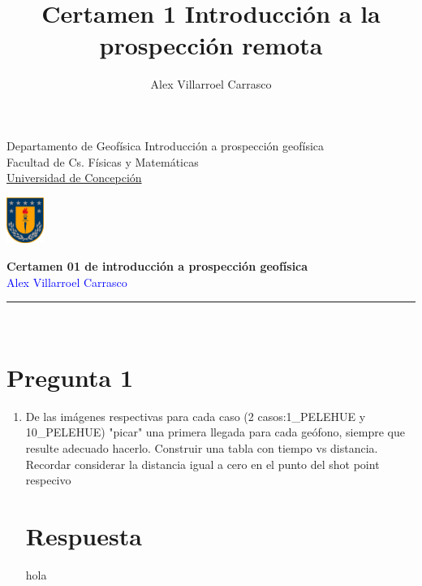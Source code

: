 \documentclass{article}
\title{Certamen 1 Introducción a la prospección remota}
\author{Alex Villarroel Carrasco}
\theoremstyle{mytheoremstyle}
\theoremstyle{mytheoremstyle}
\theoremstyle{myproblemstyle}
\begin{document}
\usetikzlibrary{positioning}
	\pagestyle{plain}
	\begin{flushleft}
		Departamento de Geofísica \hfill Introducción a prospección geofísica\\
		Facultad de Cs. Físicas y Matemáticas\\
		\underline{Universidad de Concepción}
	\end{flushleft}
	
	\begin{flushright}\vspace{-5mm}
		\includegraphics[height=1.5cm]{escudo}
	\end{flushright}
	
	\begin{center}\vspace{-1cm}
		\textbf{\large Certamen 01 de introducción a prospección geofísica}\\
		{\textcolor{blue}{Alex Villarroel Carrasco}}\\
	\end{center}
	\rule{\linewidth}{0.1mm}
	\\
    \section{Pregunta 1}
    \begin{enumerate}[label=\alph*)]
        \item De las imágenes respectivas para cada caso (2 casos:1\_PELEHUE y 10\_PELEHUE) "picar" una primera llegada para cada geófono, siempre que resulte adecuado hacerlo. Construir una tabla con tiempo vs distancia. Recordar considerar la distancia igual a cero en el punto del shot point respecivo
        \section*{Respuesta}
        hola
    \end{enumerate}
    
\end{document}
